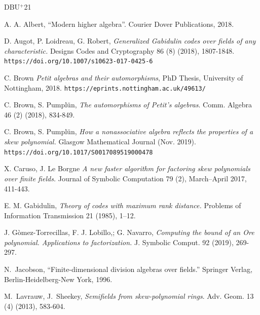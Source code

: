 \documentclass[12pt]{amsart}
\theoremstyle{plain}
\theoremstyle{definition}
\numberwithin{equation}{section}
\numberwithin{figure}{section}
\begin{document}
\newcommand{\etalchar}[1]{$^{#1}$}
\providecommand{\bysame}{\leavevmode\hbox to3em{\hrulefill}\thinspace}
\providecommand{\MR}{\relax\ifhmode\unskip\space\fi MR }
\providecommand{\MRhref}[2]{%
  \href{http://www.ams.org/mathscinet-getitem?mr=#1}{#2}
}
\providecommand{\href}[2]{#2}
\begin{thebibliography}{DBU{\etalchar{+}}21}



 A. A. Albert, ``Modern higher algebra''. Courier Dover Publications, 2018.


 D. Augot, P. Loidreau, G. Robert, \emph{Generalized Gabidulin codes over fields of any characteristic.} Designs Codes and Cryptography 86 (8) (2018), 1807-1848.
     \verb#https://doi.org/10.1007/s10623-017-0425-6#


  C. Brown %
  \emph{Petit algebras and their automorphisms}, PhD Thesis, University of Nottingham, 2018. 	\verb#https://eprints.nottingham.ac.uk/49613/#


       C. Brown,  S. Pumpl\"un, \emph{The automorphisms of Petit's algebras}.
  Comm. Algebra  46 (2) (2018), 834-849.

 C. Brown, S. Pumpl\"un,
 \emph{How a nonassociative algebra reflects the properties of a skew polynomial.}
  Glasgow Mathematical Journal (Nov. 2019).
\\   \verb#https://doi.org/10.1017/S0017089519000478#


 X. Caruso, J. Le Borgne \emph{A new faster algorithm for factoring skew polynomials over finite fields.} Journal of Symbolic Computation 79 (2), March–April 2017, 411-443.

 E. M. Gabidulin, \emph{Theory of codes with maximum rank distance.} Problems of Information Transmission 21 (1985), 1–12.


 J. G\`{o}mez-Torrecillas,  F. J. Lobillo,; G. Navarro, \emph{Computing the bound of an Ore polynomial.
 Applications to factorization.} J. Symbolic Comput. 92 (2019), 269-297. 


 N.~Jacobson, ``Finite-dimensional division algebras over fields.'' Springer
Verlag, Berlin-Heidelberg-New York, 1996.


 M.~Lavrauw, J.~Sheekey, \emph{Semifields from skew-polynomial rings}. Adv. Geom. 13 (4) (2013), 583-604.


\end{thebibliography}
\end{document}
